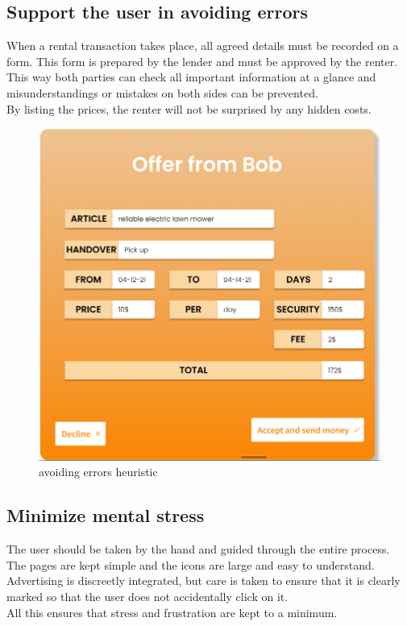\subsection{Support the user in avoiding errors}
When a rental transaction takes place, all agreed details must be recorded on a form. This form is prepared by the lender and must be approved by the renter. This way both parties can check all important information at a glance and misunderstandings or mistakes on both sides can be prevented. \\
	By listing the prices, the renter will not be surprised by any hidden costs.\\
		\begin{figure}[H]
		\centering
		\includegraphics[width=0.7\linewidth]{abb/1_usability_guidelines/heuristic_avoid_errors.png}
		\caption{avoiding errors heuristic}
		\label{fig:heuristic_avoiding_errors}
	\end{figure}

\subsection{Minimize mental stress}
The user should be taken by the hand and guided through the entire process. The pages are kept simple and the icons are large and easy to understand. Advertising is discreetly integrated, but care is taken to ensure that it is clearly marked so that the user does not accidentally click on it. \\
All this ensures that stress and frustration are kept to a minimum.



